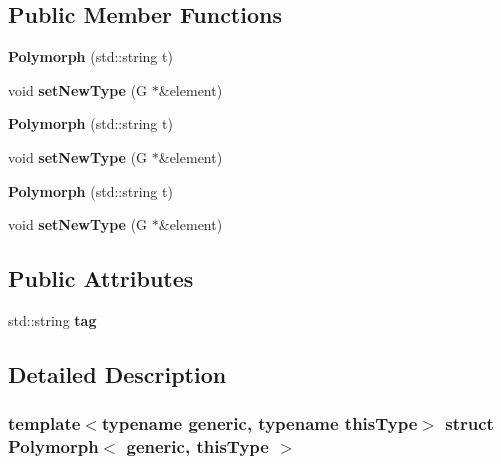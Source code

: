 \subsection*{Public Member Functions}
\begin{DoxyCompactItemize}
\item 
\mbox{\label{structPolymorph_a112a9ce47d21c4d945b603481f04436a}} 
{\bfseries Polymorph} (std\+::string t)
\item 
\mbox{\label{structPolymorph_a7d44a14d2b725880a416a359de263813}} 
void {\bfseries set\+New\+Type} (G $\ast$\&element)
\item 
\mbox{\label{structPolymorph_a112a9ce47d21c4d945b603481f04436a}} 
{\bfseries Polymorph} (std\+::string t)
\item 
\mbox{\label{structPolymorph_a7d44a14d2b725880a416a359de263813}} 
void {\bfseries set\+New\+Type} (G $\ast$\&element)
\item 
\mbox{\label{structPolymorph_a112a9ce47d21c4d945b603481f04436a}} 
{\bfseries Polymorph} (std\+::string t)
\item 
\mbox{\label{structPolymorph_a7d44a14d2b725880a416a359de263813}} 
void {\bfseries set\+New\+Type} (G $\ast$\&element)
\end{DoxyCompactItemize}
\subsection*{Public Attributes}
\begin{DoxyCompactItemize}
\item 
\mbox{\label{structPolymorph_a1e47664581636ee02b594126d5a6d70c}} 
std\+::string {\bfseries tag}
\end{DoxyCompactItemize}


\subsection{Detailed Description}
\subsubsection*{template$<$typename generic, typename this\+Type$>$\newline
struct Polymorph$<$ generic, this\+Type $>$}

